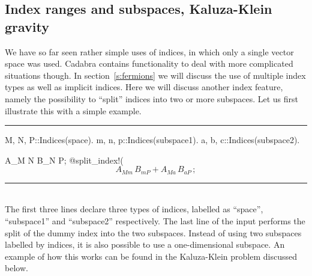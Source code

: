 \documentclass[11pt]{article}
\newcommand{\toprule}{\par\vspace{1ex}\noindent\hspace{25pt}\rule{435pt}{.1pt}}
\newcommand{\botrule}{\noindent\hspace{25pt}\rule{435pt}{.1pt}\\[2ex]}
\newenvironment{cdbin}{\fvset{firstnumber=1}\color[named]{Blue}\Verbatim}{\endVerbatim}
\newenvironment{cdbout}{\vspace{-1ex}\begin{equation}}{\end{equation}\vspace{-1ex}}
\newcommand{\Cdb}{{Cadabra}\xspace}
\begin{document}
\subsection{Index ranges and subspaces, Kaluza-Klein gravity}
\label{s:example2}

We have so far seen rather simple uses of indices, in which only a
single vector space was used. \Cdb contains functionality to deal with
more complicated situations though. In section~\ref{s:fermions} we
will discuss the use of multiple index types as well as implicit
indices. Here we will discuss another index feature, namely the
possibility to ``split'' indices into two or more subspaces. Let us
first illustrate this with a simple example.
\toprule
\begin{cdbin}
{M, N, P}::Indices(space).
{m, n, p}::Indices(subspace1).
{a, b, c}::Indices(subspace2).

A_{M N} B_{N P};
@split_index!(%
\end{cdbin}
\begin{cdbout}
A_{M m} \, B_{m P} + A_{M a}\, B_{a P}\,;
\end{cdbout}
\botrule 
The first three lines declare three types of indices, labelled as
``space'', ``subspace1'' and ``subspace2'' respectively. The last line
of the input performs the split of the dummy index into the two
subspaces. Instead of using two subspaces labelled by indices, it is
also possible to use a one-dimensional subspace. An example of how
this works can be found in the Kaluza-Klein problem discussed below.
\end{document}
